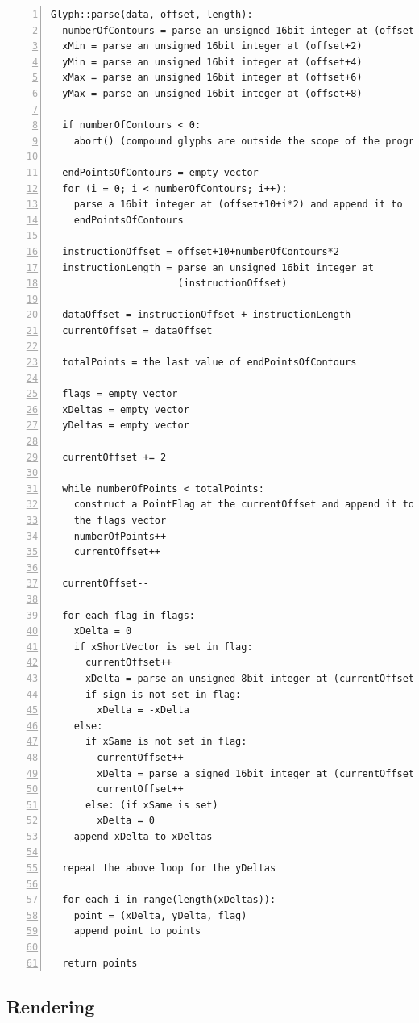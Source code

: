 \documentclass{report}
\begin{document}
\begin{Verbatim}[numbers=left]
Glyph::parse(data, offset, length):
  numberOfContours = parse an unsigned 16bit integer at (offset)
  xMin = parse an unsigned 16bit integer at (offset+2)
  yMin = parse an unsigned 16bit integer at (offset+4)
  xMax = parse an unsigned 16bit integer at (offset+6)
  yMax = parse an unsigned 16bit integer at (offset+8)

  if numberOfContours < 0:
    abort() (compound glyphs are outside the scope of the program)

  endPointsOfContours = empty vector
  for (i = 0; i < numberOfContours; i++):
    parse a 16bit integer at (offset+10+i*2) and append it to   \
    endPointsOfContours

  instructionOffset = offset+10+numberOfContours*2
  instructionLength = parse an unsigned 16bit integer at
                      (instructionOffset)

  dataOffset = instructionOffset + instructionLength
  currentOffset = dataOffset
  
  totalPoints = the last value of endPointsOfContours

  flags = empty vector
  xDeltas = empty vector
  yDeltas = empty vector

  currentOffset += 2
  
  while numberOfPoints < totalPoints:
    construct a PointFlag at the currentOffset and append it to  \
    the flags vector
    numberOfPoints++
    currentOffset++

  currentOffset--

  for each flag in flags:
    xDelta = 0
    if xShortVector is set in flag:
      currentOffset++
      xDelta = parse an unsigned 8bit integer at (currentOffset)
      if sign is not set in flag:
        xDelta = -xDelta
    else:
      if xSame is not set in flag:
        currentOffset++
        xDelta = parse a signed 16bit integer at (currentOffset)
        currentOffset++
      else: (if xSame is set)
        xDelta = 0 
    append xDelta to xDeltas

  repeat the above loop for the yDeltas

  for each i in range(length(xDeltas)):
    point = (xDelta, yDelta, flag)
    append point to points

  return points
\end{Verbatim}


\subsection{Rendering}
\end{document}
